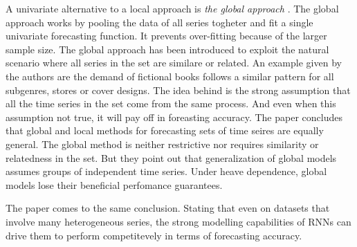 A univariate alternative to a local approach is \textit{the global approach}
\citep{Rabanser2020}.
The global approach works by pooling the data of all series togheter and fit a single univariate 
forecasting function. It prevents over-fitting because of the larger sample size.
The global approach has been introduced to exploit the natural scenario where all series
in the set are similare or related. An example given by the authors are the demand of fictional
books follows a similar pattern for all subgenres, stores or cover designs.
The idea behind is the strong assumption that all the time series in the set
come from the same process.
And even when this assumption not true, it will pay off in foreasting accuracy.
The paper \cite{Rabanser2020} concludes that global and local methods for forecasting
sets of time seires are equally general. The global method is neither restrictive nor requires
similarity or relatedness in the set.
But they point out that generalization of global models assumes groups of independent time series.
Under heave dependence, global models lose their beneficial perfomance guarantees. 

The paper \cite{Hewamalage2021} comes to the same conclusion. Stating that 
even on datasets that involve many heterogeneous series, the strong modelling capabilities of RNNs can drive
them to perform competitevely in terms of forecasting accuracy.


%
